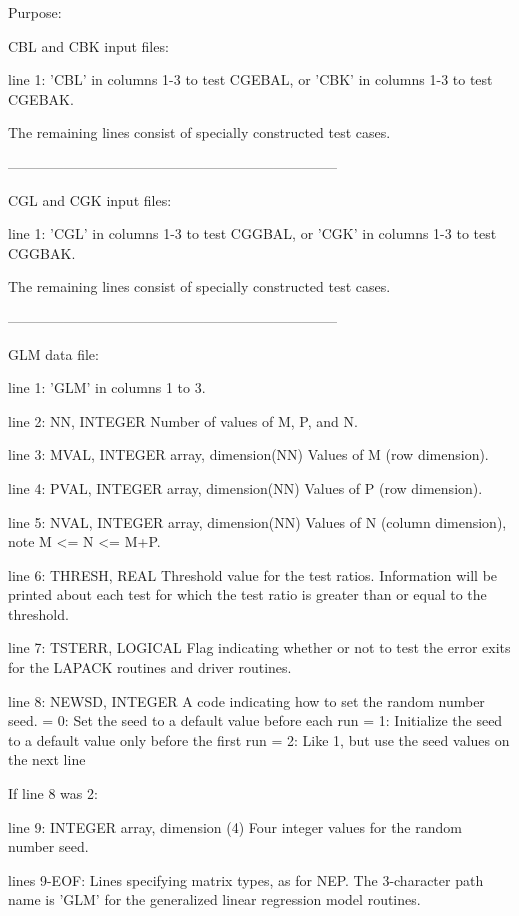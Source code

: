 \begin{DoxyParagraph}{Purpose\+: }
\begin{DoxyVerb}
 CBL and CBK input files:

 line 1:  'CBL' in columns 1-3 to test CGEBAL, or 'CBK' in
          columns 1-3 to test CGEBAK.

 The remaining lines consist of specially constructed test cases.

-----------------------------------------------------------------------

 CGL and CGK input files:

 line 1:  'CGL' in columns 1-3 to test CGGBAL, or 'CGK' in
          columns 1-3 to test CGGBAK.

 The remaining lines consist of specially constructed test cases.

-----------------------------------------------------------------------

 GLM data file:

 line 1:  'GLM' in columns 1 to 3.

 line 2:  NN, INTEGER
          Number of values of M, P, and N.

 line 3:  MVAL, INTEGER array, dimension(NN)
          Values of M (row dimension).

 line 4:  PVAL, INTEGER array, dimension(NN)
          Values of P (row dimension).

 line 5:  NVAL, INTEGER array, dimension(NN)
          Values of N (column dimension), note M <= N <= M+P.

 line 6:  THRESH, REAL
          Threshold value for the test ratios.  Information will be
          printed about each test for which the test ratio is greater
          than or equal to the threshold.

 line 7:  TSTERR, LOGICAL
          Flag indicating whether or not to test the error exits for
          the LAPACK routines and driver routines.

 line 8:  NEWSD, INTEGER
          A code indicating how to set the random number seed.
          = 0:  Set the seed to a default value before each run
          = 1:  Initialize the seed to a default value only before the
                first run
          = 2:  Like 1, but use the seed values on the next line

 If line 8 was 2:

 line 9:  INTEGER array, dimension (4)
          Four integer values for the random number seed.

 lines 9-EOF:  Lines specifying matrix types, as for NEP.
          The 3-character path name is 'GLM' for the generalized
          linear regression model routines.


\end{DoxyVerb}
\end{DoxyParagraph}
